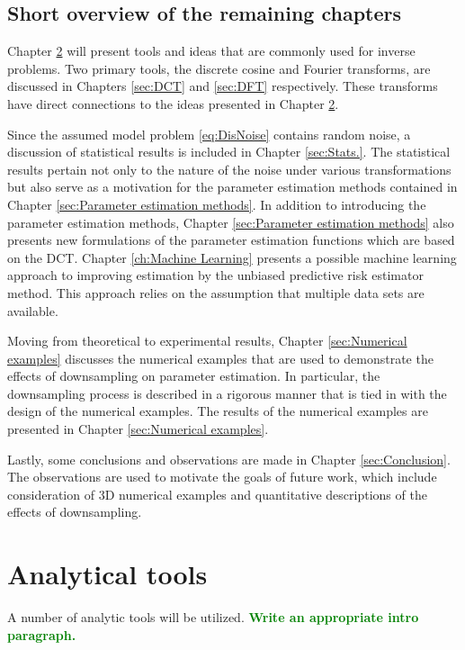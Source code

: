 \documentclass[12pt,notitlepage]{report}
\newcommand{\ToDo}[1]{\textcolor{green}{\textbf{#1}}}
\begin{document}
\section{Short overview of the remaining chapters}
Chapter \ref{sec:Analytical tools} will present tools and ideas that are commonly used for inverse problems. Two primary tools, the discrete cosine and Fourier transforms, are discussed in Chapters \ref{sec:DCT} and \ref{sec:DFT} respectively. These transforms have direct connections to the ideas presented in Chapter \ref{sec:Analytical tools}. \par 
Since the assumed model problem \eqref{eq:DisNoise} contains random noise, a discussion of statistical results is included in Chapter \ref{sec:Stats.}. The statistical results pertain not only to the nature of the noise under various transformations but also serve as a motivation for the parameter estimation methods contained in Chapter \ref{sec:Parameter estimation methods}. In addition to introducing the parameter estimation methods, Chapter \ref{sec:Parameter estimation methods} also presents new formulations of the parameter estimation functions which are based on the DCT. Chapter \ref{ch:Machine Learning} presents a possible machine learning approach to improving estimation by the unbiased predictive risk estimator method. This approach relies on the assumption that multiple data sets are available.  \par 
Moving from theoretical to experimental results, Chapter \ref{sec:Numerical examples} discusses the numerical examples that are used to demonstrate the effects of downsampling on parameter estimation. In particular, the downsampling process is described in a rigorous manner that is tied in with the design of the numerical examples. The results of the numerical examples are presented in Chapter \ref{sec:Numerical examples}. \par 
Lastly, some conclusions and observations are made in Chapter \ref{sec:Conclusion}. The observations are used to motivate the goals of future work, which include consideration of 3D numerical examples and quantitative descriptions of the effects of downsampling.

\chapter{Analytical tools} \label{sec:Analytical tools}

A number of analytic tools will be utilized. \ToDo{Write an appropriate intro paragraph.}
\end{document}

